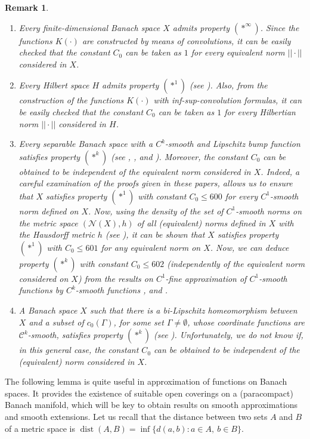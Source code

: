\documentclass[11pt]{amsart}
\newtheorem{rem}[thm]{Remark}
\numberwithin{equation}{section}
\begin{document}
\begin{rem}
\begin{enumerate}
\item Every finite-dimensional Banach space $X$ admits  property $(*^\infty)$. Since the  functions $K(\cdot)$ are constructed by means of convolutions, it can be easily checked that the constant $C_0$ can be taken as $1$ for every equivalent
norm $||\cdot||$ considered in $X$.
\item Every Hilbert space $H$ admits property $(*^1)$  (see \cite{LL}). Also, from the construction of the
functions $K(\cdot)$ with inf-sup-convolution formulas, it can be  easily checked that the constant
$C_0$ can be taken as $1$ for every Hilbertian norm $||\cdot||$ considered in $H$.
\item Every separable Banach space with a $C^k$-smooth and Lipschitz bump function satisfies property $(*^k)$ (see \cite{azafrymon}, \cite{Azafrykeener}, \cite{Fry1} and \cite{HajekJohanis}).
Moreover, the constant $C_0$ can be obtained to be independent of the equivalent norm considered in $X$. Indeed, a careful examination of the proofs given in these  papers, allows us to ensure that $X$ satisfies property $(*^1)$ with  constant $C_0\le 600$  for every  $C^1$-smooth norm defined on $X$.
Now, using  the density of the set of $C^1$-smooth norms on the metric space $(\mathcal N(X), h)$ of all (equivalent) norms
defined in $X$ with the Hausdorff metric $h$ (see \cite[Theorem II.4.1]{Deville}),
it can be shown that $X$ satisfies property $(*^1)$ with $C_0\le 601$ for any equivalent norm on $X$. Now, we can deduce property  $(*^k)$ with constant $C_0\le 602$ (independently of the equivalent norm considered on $X$)
from the results on $C^1$-fine approximation of $C^1$-smooth functions by
$C^k$-smooth functions \cite{Azfrygiljarlovo}, \cite{HajekJohanis} and \cite{Moulis}.
\item A Banach space $X$ such that there is a bi-Lipschitz homeomorphism between $X$ and a subset of $c_0(\Gamma)$, for some set $\Gamma\neq \emptyset$, whose coordinate functions are $\mathcal{C}^k$-smooth, satisfies property $(*^k)$ (see  \cite{HajekJohanis}). Unfortunately, we do not know if, in this general case, the constant $C_0$ can be obtained to be independent
of the (equivalent) norm considered in $X$.
\end{enumerate}
\end{rem}

The following lemma is quite useful in  approximation of functions on Banach spaces. It  provides the existence of suitable open coverings on a (paracompact) Banach manifold, which will be key to obtain results on smooth approximations and smooth extensions.
Let us recall that  the distance between two sets $A$ and $B$ of a metric space is
 ${\operatorname{dist}}(A,B)=\inf \{d(a,b): a\in A, \ b\in B\}$.
\end{document}

